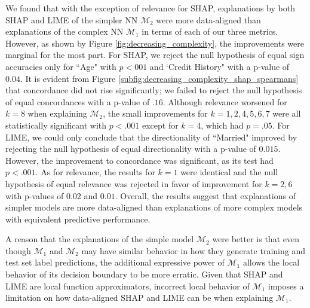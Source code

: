 \documentclass[mnsc,blindrev]{informs3}
\begin{document}
            We found that with the exception of relevance for SHAP, explanations by both SHAP and LIME of the simpler NN $\mathcal{M}_2$ were more data-aligned than explanations of the complex NN $\mathcal{M}_1$ in terms of each of our three metrics. However, as shown by Figure \ref{fig:decreasing_complexity}, the improvements were marginal for the most part. For SHAP, we reject the null hypothesis of equal sign accuracies only for ``Age" with $p<001$ and `Credit History" with a p-value of $0.04$. It is evident from Figure \ref{subfig:decreasing_complexity_shap_spearmans} that concordance did not rise significantly; we failed to reject the null hypothesis of equal concordances with a p-value of $.16$. Although relevance worsened for $k=8$ when explaining $\mathcal{M}_2$, the small improvements for $k=1,2,4,5,6,7$ were all statistically significant with $p<.001$ except for $k=4$, which had $p=.05$. %
            For LIME, we could only conclude that the directionality of ``Married" improved by rejecting the null hypothesis of equal directionality with a p-value of $0.015$. However, the improvement to concordance was significant, as its test had $p<.001$. As for relevance, the results for $k=1$ were identical and the null hypothesis of equal relevance was rejected in favor of improvement for $k=2,6$ with p-values of $0.02$ and $0.01$. Overall, the results suggest that explanations of simpler models are more data-aligned than explanations of more complex models with equivalent predictive performance. 
            
            A reason that the explanations of the simple model $\mathcal{M}_2$ were better is that even though $\mathcal{M}_1$ and $\mathcal{M}_2$ may have similar behavior in how they generate training and test set label predictions, the additional expressive power of $\mathcal{M}_1$ allows the local behavior of its decision boundary to be more erratic. Given that SHAP and LIME are local function approximators, incorrect local behavior of $\mathcal{M}_1$ imposes a limitation on how data-aligned SHAP and LIME can be when explaining $\mathcal{M}_1$. 
\end{document}
